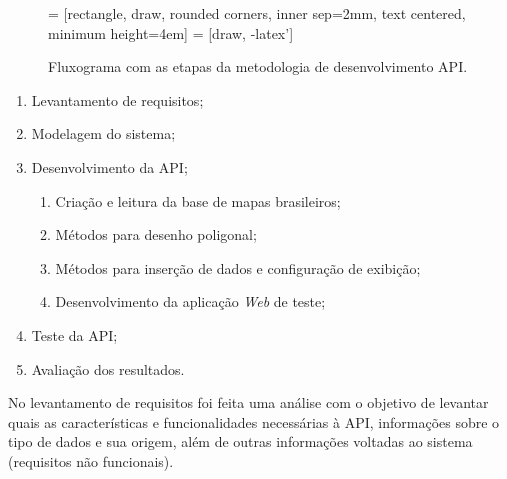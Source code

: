 \documentclass[12pt]{article}
\begin{document}
\begin{figure}[!h]

\centering

 = [rectangle, draw, rounded corners, inner sep=2mm, text centered, minimum height=4em]
 = [draw, -latex']
    

\caption{Fluxograma com as etapas da metodologia de desenvolvimento API.}
\label{fluxograma}
\end{figure}

\begin{enumerate}[I]
  \item{Levantamento de requisitos;}  
  \item{Modelagem do sistema;}
  \item{Desenvolvimento da API;}  
  	\begin{enumerate}
    	\item{Criação e leitura da base de mapas brasileiros;}  
        \item{Métodos para desenho poligonal;}  
        \item{Métodos para inserção de dados e configuração de exibição;} 
    	\item{Desenvolvimento da aplicação \emph{Web} de teste;} 
  	\end{enumerate}
  \item{Teste da API;}  
  \item{Avaliação dos resultados.}
\end{enumerate}

No levantamento de requisitos foi feita uma análise %
com o objetivo de levantar quais as características e funcionalidades necessárias à API, informações sobre o tipo de dados e sua origem, além de outras informações voltadas ao sistema (requisitos não funcionais).
\end{document}
